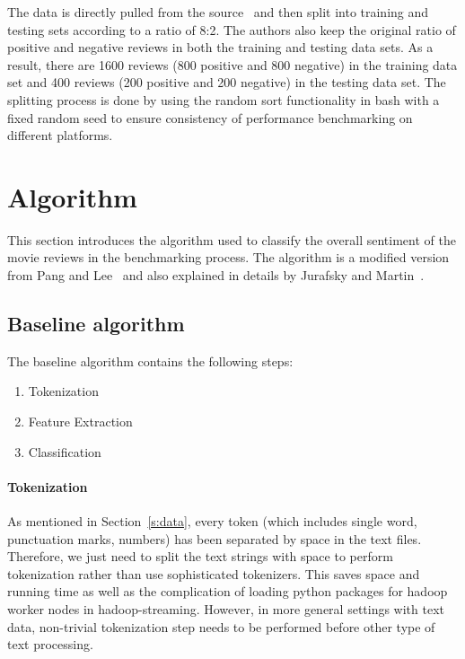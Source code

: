 The data is directly pulled from the 
source~\cite{hid-sp18-405-sentiment-data} and then split into training and 
testing sets according to a ratio of 8:2. The authors also keep the original 
ratio of positive and negative reviews in both the training and testing data 
sets. As a result, there are 1600 reviews (800 positive and 800 negative) in 
the training data set and 400 reviews (200 positive and 200 negative) in the 
testing data set. The splitting process is done by using the random sort 
functionality in bash with a fixed random seed to ensure consistency of 
performance benchmarking on different platforms. 


\section{Algorithm}\label{s:algorithm}

This section introduces the algorithm used to classify the overall sentiment 
of the movie reviews in the benchmarking process. The algorithm is a 
modified version from Pang and 
Lee~\cite{hid-sp18-405-sentiment-pang2004asentimental} and also 
explained in details by Jurafsky and 
Martin~\cite{hid-sp18-405-sentiment-jurafsky2009}. 

\subsection{Baseline algorithm}\label{ss:base}

The baseline algorithm contains the following steps:

\begin{enumerate}
	\item Tokenization
	\item Feature Extraction
	\item Classification
\end{enumerate}

\paragraph{Tokenization}
As mentioned in Section~\ref{s:data}, every token (which includes 
single word, punctuation marks, numbers) has been separated by space in 
the text files. Therefore, we just need to split the text strings with space to 
perform tokenization rather than use sophisticated tokenizers. This saves 
space and running time as well as the complication of loading  python 
packages for hadoop worker nodes in hadoop-streaming. However, in more 
general settings with text data, non-trivial tokenization step needs to be 
performed before other type of text processing.

